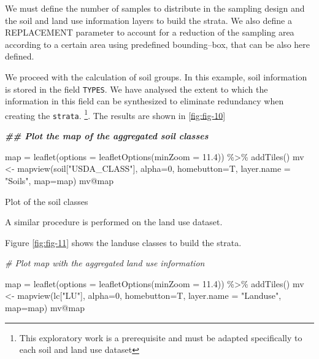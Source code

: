 \documentclass[
  10pt,
  b5paper,
  oneside]{book}
\newenvironment{Shaded}{\begin{snugshade}}{\end{snugshade}}
\newcommand{\AttributeTok}[1]{\textcolor[rgb]{0.77,0.63,0.00}{#1}}
\newcommand{\CommentTok}[1]{\textcolor[rgb]{0.56,0.35,0.01}{\textit{#1}}}
\newcommand{\DecValTok}[1]{\textcolor[rgb]{0.00,0.00,0.81}{#1}}
\newcommand{\DocumentationTok}[1]{\textcolor[rgb]{0.56,0.35,0.01}{\textbf{\textit{#1}}}}
\newcommand{\FloatTok}[1]{\textcolor[rgb]{0.00,0.00,0.81}{#1}}
\newcommand{\FunctionTok}[1]{\textcolor[rgb]{0.00,0.00,0.00}{#1}}
\newcommand{\NormalTok}[1]{#1}
\newcommand{\OtherTok}[1]{\textcolor[rgb]{0.56,0.35,0.01}{#1}}
\newcommand{\SpecialCharTok}[1]{\textcolor[rgb]{0.00,0.00,0.00}{#1}}
\newcommand{\StringTok}[1]{\textcolor[rgb]{0.31,0.60,0.02}{#1}}
\begin{document}
We must define the number of samples to distribute in the sampling design and the soil and land use information layers to build the strata. We also define a REPLACEMENT parameter to account for a reduction of the sampling area according to a certain area using predefined bounding--box, that can be also here defined.

We proceed with the calculation of soil groups. In this example, soil information is stored in the field \texttt{TYPES}. We have analysed the extent to which the information in this field can be synthesized to eliminate redundancy when creating the \texttt{strata}. \footnote{This exploratory work is a prerequisite and must be adapted specifically to each soil and land use dataset}.
The results are shown in \ref{fig:fig-10}

\begin{Shaded}
\begin{Highlighting}[]
  \DocumentationTok{\#\# Plot the map of the aggregated soil classes}

\NormalTok{    map }\OtherTok{=} \FunctionTok{leaflet}\NormalTok{(}\AttributeTok{options =} \FunctionTok{leafletOptions}\NormalTok{(}\AttributeTok{minZoom =} \FloatTok{11.4}\NormalTok{)) }\SpecialCharTok{\%\textgreater{}\%}
      \FunctionTok{addTiles}\NormalTok{()}
\NormalTok{    mv }\OtherTok{\textless{}{-}} \FunctionTok{mapview}\NormalTok{(soil[}\StringTok{"USDA\_CLASS"}\NormalTok{], }\AttributeTok{alpha=}\DecValTok{0}\NormalTok{, }\AttributeTok{homebutton=}\NormalTok{T, }\AttributeTok{layer.name =} \StringTok{"Soils"}\NormalTok{, }\AttributeTok{map=}\NormalTok{map)}
\NormalTok{    mv}\SpecialCharTok{@}\NormalTok{map}
\end{Highlighting}
\end{Shaded}

\label{fig:fig-10}Plot of the soil classes

A similar procedure is performed on the land use dataset.

Figure \ref{fig:fig-11} shows the landuse classes to build the strata.

\begin{Shaded}
\begin{Highlighting}[]
\CommentTok{\# Plot map with the aggregated land use information}
  
\NormalTok{  map }\OtherTok{=} \FunctionTok{leaflet}\NormalTok{(}\AttributeTok{options =} \FunctionTok{leafletOptions}\NormalTok{(}\AttributeTok{minZoom =} \FloatTok{11.4}\NormalTok{)) }\SpecialCharTok{\%\textgreater{}\%}
  \FunctionTok{addTiles}\NormalTok{()}
\NormalTok{  mv }\OtherTok{\textless{}{-}} \FunctionTok{mapview}\NormalTok{(lc[}\StringTok{"LU"}\NormalTok{], }\AttributeTok{alpha=}\DecValTok{0}\NormalTok{, }\AttributeTok{homebutton=}\NormalTok{T, }\AttributeTok{layer.name =} \StringTok{"Landuse"}\NormalTok{, }\AttributeTok{map=}\NormalTok{map)}
\NormalTok{  mv}\SpecialCharTok{@}\NormalTok{map}
\end{Highlighting}
\end{Shaded}
\end{document}

